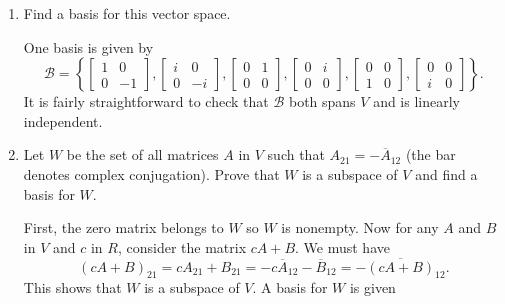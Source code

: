\begin{enumerate}
\begin{proof}
    The remaining vector space axioms follow from the properties of
    matrix addition and scalar multiplication. Therefore $V$ is a
    vector space.
  \end{proof}
\item Find a basis for this vector space.
  \begin{solution}
    One basis is given by
    \begin{equation*}
      \mathcal{B} =
      \left\{
        \begin{bmatrix}
          1 & 0 \\ 0 & -1
        \end{bmatrix},
        \begin{bmatrix}
          i & 0 \\ 0 & -i
        \end{bmatrix},
        \begin{bmatrix}
          0 & 1 \\ 0 & 0
        \end{bmatrix},
        \begin{bmatrix}
          0 & i \\ 0 & 0
        \end{bmatrix},
        \begin{bmatrix}
          0 & 0 \\ 1 & 0
        \end{bmatrix},
        \begin{bmatrix}
          0 & 0 \\ i & 0
        \end{bmatrix}
      \right\}.
    \end{equation*}
    It is fairly straightforward to check that $\mathcal{B}$ both
    spans $V$ and is linearly independent.
  \end{solution}
\item Let $W$ be the set of all matrices $A$ in $V$ such that
  $A_{21} = -\overline{A}_{12}$ (the bar denotes complex
  conjugation). Prove that $W$ is a subspace of $V$ and find a basis
  for $W$.
  \begin{solution}
    First, the zero matrix belongs to $W$ so $W$ is nonempty. Now for
    any $A$ and $B$ in $V$ and $c$ in $R$, consider the matrix
    $cA + B$. We must have
    \begin{equation*}
      (cA + B)_{21} = cA_{21} + B_{21}
      = -c\overline{A}_{12} - \overline{B}_{12}
      = -\overline{(cA + B)}_{12}.
    \end{equation*}
    This shows that $W$ is a subspace of $V$. A basis for $W$ is given

\end{solution}
\end{enumerate}
